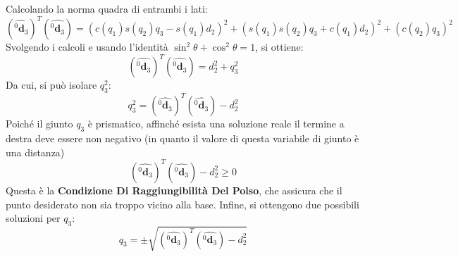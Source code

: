 \documentclass[11pt, a4paper]{report}
\begin{document}
Calcolando la norma quadra di entrambi i lati:
\[
    (\hat{^{0}\mathbf{d}_{3}})^{T} (\hat{^{0}\mathbf{d}_{3}}) =
    (c(q_{1})s(q_{2})q_{3} - s(q_{1})d_{2})^2 + (s(q_{1})s(q_{2})q_{3} + c(q_{1})d_{2})^2 + (c(q_{2})q_{3})^2
\]
Svolgendo i calcoli e usando l'identità \(\sin^2\theta + \cos^2\theta = 1\), si ottiene:
\[
    (\hat{^{0}\mathbf{d}_{3}})^{T} (\hat{^{0}\mathbf{d}_{3}}) = d_{2}^{2} + q_{3}^{2}
\]
Da cui, si può isolare \(q_{3}^{2}\):
\[
    q_{3}^{2} = (\hat{^{0}\mathbf{d}_{3}})^{T} (\hat{^{0}\mathbf{d}_{3}}) - d_{2}^{2}
\]
Poiché il giunto \(q_3\) è prismatico, affinché esista una soluzione reale il termine a destra deve essere non negativo (in quanto il valore di questa variabile di giunto è una distanza)
\[
    (\hat{^{0}\mathbf{d}_{3}})^{T} (\hat{^{0}\mathbf{d}_{3}}) - d_{2}^{2} \geq 0
\]
Questa è la \textbf{Condizione Di Raggiungibilità Del Polso}, che assicura che il punto desiderato non sia troppo vicino alla base. Infine, si ottengono due possibili soluzioni per \( q_{3} \):
\[
    \boxed{
        q_{3} = \pm \sqrt{(\hat{^{0}\mathbf{d}_{3}})^{T} (\hat{^{0}\mathbf{d}_{3}}) - d_{2}^{2}}
    }
\]
\newpage
\end{document}

